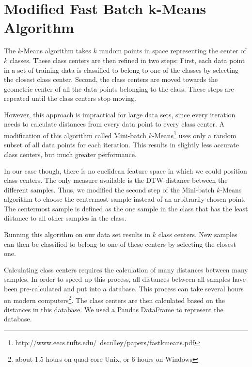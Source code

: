 \section{Modified Fast Batch k-Means Algorithm}
\label{sec:TheoryKMeans}

The $k$-Means algorithm takes $k$ random points in space representing the center of $k$ classes. These class centers are then refined in two steps: First, each data point in a set of training data is classified to belong to one of the classes by selecting the closest class center. Second, the class centers are moved towards the geometric center of all the data points belonging to the class. These steps are repeated until the class centers stop moving.

However, this approach is impractical for large data sets, since every iteration needs to calculate distances from every data point to every class center. A modification of this algorithm called Mini-batch $k$-Means\footnote{http://www.eecs.tufts.edu/~dsculley/papers/fastkmeans.pdf} uses only a random subset of all data points for each iteration. This results in slightly less accurate class centers, but much greater performance.

In our case though, there is no euclidean feature space in which we could position class centers. The only measure available is the DTW-distance between the different samples. Thus, we modified the second step of the Mini-batch $k$-Means algorithm to choose the centermost sample instead of an arbitrarily chosen point. The centermost sample is defined as the one sample in the class that has the least distance to all other samples in the class.

Running this algorithm on our data set results in $k$ class centers. New samples can then be classified to belong to one of these centers by selecting the closest one.

Calculating class centers requires the calculation of many distances between many samples. In order to speed up this process, all distances between all samples have been pre-calculated and put into a database. This process can take several hours on modern computers\footnote{about 1.5 hours on quad-core Unix, or 6 hours on Windows}. The class centers are then calculated based on the distances in this database. We used a Pandas DataFrame to represent the database.

